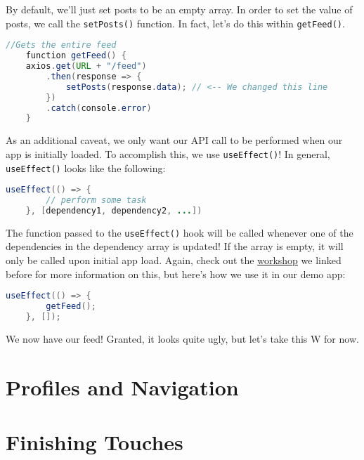 By default, we'll just set posts to be an empty array. In order to set the value of posts, we call the \texttt{setPosts()} function. In fact, let's do this within  \texttt{getFeed()}.

\begin{lstlisting}[language=Java]
    //Gets the entire feed
    function getFeed() {
    axios.get(URL + "/feed")
        .then(response => { 
            setPosts(response.data); // <-- We changed this line
        })
        .catch(console.error)
    }
\end{lstlisting}

As an additional caveat, we only want our API call to be performed when our app is initially loaded. To accomplish this, we use \texttt{useEffect()}! In general, \texttt{useEffect()} looks like the following:

\begin{lstlisting}[language=Java]
    useEffect(() => {
        // perform some task
    }, [dependency1, dependency2, ...])
\end{lstlisting}

The function passed to the \texttt{useEffect()} hook will be called whenever one of the dependencies in the dependency array is updated! If the array is empty, it will only be called upon initial app load. Again, check out the \href{https://www.youtube.com/watch?v=ehgl3HpR5xQ}{workshop} we linked before for more information on this, but here's how we use it in our demo app:

\begin{lstlisting}[language=Java]
    useEffect(() => {
        getFeed();
    }, []);
\end{lstlisting}

We now have our feed! Granted, it looks quite ugly, but let's take this W for now. 

\section{Profiles and Navigation}

\section{Finishing Touches}
